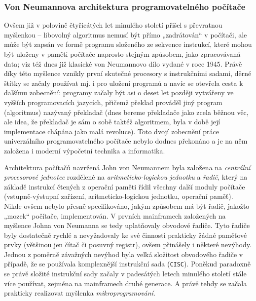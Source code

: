 {      \subsubsection{Von Neumannova architektura programovatelného počítače}
        Ovšem již v polovině čtyřicátých let minulého století přišel \wikiNeumann s převratnou 
        myšlenkou – libovolný algoritmus nemusí být přímo „zadrátován“ v počítači, ale může být 
        zapsán ve formě programu složeného ze sekvence instrukcí, které mohou být uloženy v paměti 
        počítače naprosto stejným způsobem, jako zpracovávaná data; viz též dnes již klasické von 
        Neumannovo dílo \wikiEDVAC vydané v roce 1945. Právě díky této myšlence vznikly první 
        skutečné procesory s instrukčními sadami, děrné štítky se začaly používat mj. i pro uložení 
        programů a navíc se otevřela cesta k dalšímu zobecnění: programy začaly být asi o deset let 
        později vytvářeny ve vyšších programovacích jazycích, přičemž překlad prováděl jiný program 
        (algoritmus) nazývaný překladač (dnes bereme překladače jako zcela běžnou věc, ale idea, že 
        překladač je sám o sobě taktéž algoritmem, byla v době její implementace chápána jako malá 
        revoluce). Toto dvojí zobecnění práce univerzálního programovatelného počítače nebylo 
        dodnes překonáno a je na něm založena i moderní výpočetní technika a informatika.
        
        Architektura počítačů navržená John von Neumannem byla založena na \emph{centrální 
        procesorové jednotce} rozdělené na \emph{aritme\-ticko-logickou jednotku} a 
        \emph{řadič}, 
        který na základě instrukcí čtených z operační paměti řídil všechny další moduly počítače 
        (vstupně-výstupní zařízení, aritmeticko-logickou jednotku, operační paměť). Nikde ovšem 
        nebylo přesně specifikováno, jakým způsobem má být řadič, jakožto „mozek“ počítače, 
        implementován. V prvních mainframech založených na myšlence Johna von Neumanna se tedy 
        uplatňovaly obvodové řadiče. Tyto řadiče byly dostatečně rychlé a nevyžadovaly ke své 
        činnosti prakticky žádné paměťové prvky (většinou jen čítač či posuvný registr), ovšem 
        přinášely i některé nevýhody. Jednou z poměrně závažných nevýhod byla velká složitost 
        obvodového řadiče v případě, že se používala komplexnější instrukční sada (\texttt{CISC}). 
        Poněkud paradoxně se právě složité instrukční sady začaly v padesátých letech minulého 
        století stále více používat, zejména na mainframech druhé generace. A právě tehdy se začala 
        prakticky realizovat myšlenka \emph{mikroprogramování}.
      
}

